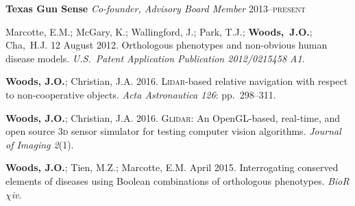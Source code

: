 \documentclass[12pt,letterpaper]{article}
\newenvironment{itemize*}%
{\begin{itemize}%
  \setlength{\itemsep}{0pt}}%
{\end{itemize}}
\newcommand{\mhead}[1]{\leavevmode\marginpar{\sffamily\footnotesize #1}}
\newcommand{\rdate}[1]{{\hfill #1}}
\begin{document}
\medskip
\textbf{Texas Gun Sense}\newline
\emph{Co-founder, Advisory Board Member} \rdate{2013--\textsc{present}}%


\bigskip
\mhead{Patents}%
\par\vspace{-\baselineskip}Marcotte, E.M.; McGary, K.; Wallingford, J.; Park, T.J.; \textbf{Woods,~J.O.}; Cha,~H.J. 12 August 2012. Orthologous phenotypes and non-obvious human disease models. \textit{U.S.\ Patent Application Publication 2012/0215458 A1}.

\bigskip
\mhead{Articles}%
\par\vspace{-\baselineskip}\textbf{Woods, J.O.}; Christian, J.A. 2016. \textsc{Lidar}-based relative navigation with respect to non-cooperative objects. \textit{Acta Astronautica 126}: pp.\ 298--311.

\medskip
\par\textbf{Woods, J.O.}; Christian, J.A. 2016. \textsc{Glidar}: An OpenGL-based, real-time, and open source 3\textsc{d} sensor simulator for testing computer vision algorithms. \textit{Journal of Imaging 2}(1).

\medskip
\par\textbf{Woods, J.O.}; Tien, M.Z.; Marcotte, E.M. April 2015. Interrogating conserved elements of diseases using Boolean combinations of orthologous phenotypes. \textit{BioR$\chi$iv}.
\end{document}
